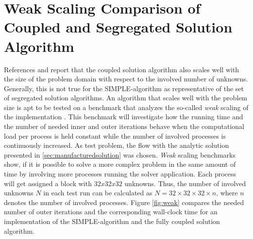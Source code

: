 \section{Weak Scaling Comparison of Coupled and Segregated Solution Algorithm}
\label{sec:weakscaling}

References \cite{darwish09} and \cite{vakilipour12} report that the coupled solution algorithm also scales well with the size of the problem domain with respect to the involved number of unknowns. Generally, this is not true for the SIMPLE-algorithm as representative of the set of segregated solution algorithms. An algorithm that scales well with the problem size is apt to be tested on a benchmark that analyzes the so-called \emph{weak} scaling of the implementation \cite{hager11}. This benchmark will investigate how the running time and the number of needed inner and outer iterations behave when the computational load per process is held constant while the number of involved processes is continuously increased. As test problem, the flow with the analytic solution presented in \ref{sec:manufacturedsolution} was chosen. \emph{Weak} scaling benchmarks show, if it is possible to solve a more complex problem in the same amount of time by involving more processes running the solver application. Each process will get assigned a block with \(32x32x32\) unknowns. Thus, the number of involved unknowns \(N\) in each test run can be calculated as \( N = 32\times32\times32\times n \), where \(n\) denotes the number of involved processes. Figure \ref{fig:weak} compares the needed number of outer iterations and the corresponding wall-clock time for an implementation of the SIMPLE-algorithm and the fully coupled solution algorithm.

